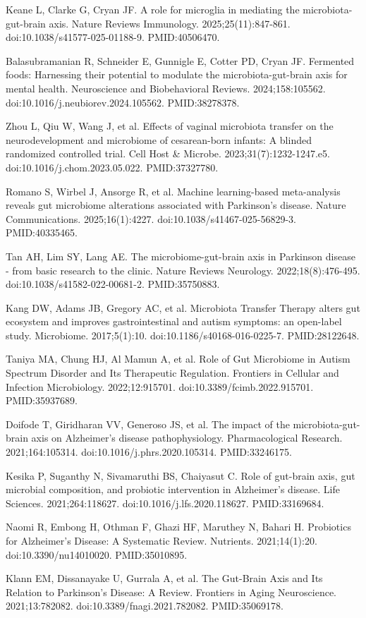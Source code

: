 \documentclass[11pt,oneside]{book}
\newcommand{\reff}[2]{\par\hangindent=7mm\hangafter=1\noindent[#1]\hspace{2mm}#2\par}
\begin{document}
\reff{59}{Keane L, Clarke G, Cryan JF. A role for microglia in mediating the microbiota-gut-brain axis. Nature Reviews Immunology. 2025;25(11):847-861. doi:10.1038/s41577-025-01188-9. PMID:40506470.}
\reff{60}{Balasubramanian R, Schneider E, Gunnigle E, Cotter PD, Cryan JF. Fermented foods: Harnessing their potential to modulate the microbiota-gut-brain axis for mental health. Neuroscience and Biobehavioral Reviews. 2024;158:105562. doi:10.1016/j.neubiorev.2024.105562. PMID:38278378.}
\reff{61}{Zhou L, Qiu W, Wang J, et al. Effects of vaginal microbiota transfer on the neurodevelopment and microbiome of cesarean-born infants: A blinded randomized controlled trial. Cell Host \& Microbe. 2023;31(7):1232-1247.e5. doi:10.1016/j.chom.2023.05.022. PMID:37327780.}
\reff{62}{Romano S, Wirbel J, Ansorge R, et al. Machine learning-based meta-analysis reveals gut microbiome alterations associated with Parkinson's disease. Nature Communications. 2025;16(1):4227. doi:10.1038/s41467-025-56829-3. PMID:40335465.}
\reff{63}{Tan AH, Lim SY, Lang AE. The microbiome-gut-brain axis in Parkinson disease - from basic research to the clinic. Nature Reviews Neurology. 2022;18(8):476-495. doi:10.1038/s41582-022-00681-2. PMID:35750883.}
\reff{64}{Kang DW, Adams JB, Gregory AC, et al. Microbiota Transfer Therapy alters gut ecosystem and improves gastrointestinal and autism symptoms: an open-label study. Microbiome. 2017;5(1):10. doi:10.1186/s40168-016-0225-7. PMID:28122648.}
\reff{65}{Taniya MA, Chung HJ, Al Mamun A, et al. Role of Gut Microbiome in Autism Spectrum Disorder and Its Therapeutic Regulation. Frontiers in Cellular and Infection Microbiology. 2022;12:915701. doi:10.3389/fcimb.2022.915701. PMID:35937689.}
\reff{66}{Doifode T, Giridharan VV, Generoso JS, et al. The impact of the microbiota-gut-brain axis on Alzheimer's disease pathophysiology. Pharmacological Research. 2021;164:105314. doi:10.1016/j.phrs.2020.105314. PMID:33246175.}
\reff{67}{Kesika P, Suganthy N, Sivamaruthi BS, Chaiyasut C. Role of gut-brain axis, gut microbial composition, and probiotic intervention in Alzheimer's disease. Life Sciences. 2021;264:118627. doi:10.1016/j.lfs.2020.118627. PMID:33169684.}
\reff{68}{Naomi R, Embong H, Othman F, Ghazi HF, Maruthey N, Bahari H. Probiotics for Alzheimer's Disease: A Systematic Review. Nutrients. 2021;14(1):20. doi:10.3390/nu14010020. PMID:35010895.}
\reff{69}{Klann EM, Dissanayake U, Gurrala A, et al. The Gut-Brain Axis and Its Relation to Parkinson's Disease: A Review. Frontiers in Aging Neuroscience. 2021;13:782082. doi:10.3389/fnagi.2021.782082. PMID:35069178.}
\end{document}
